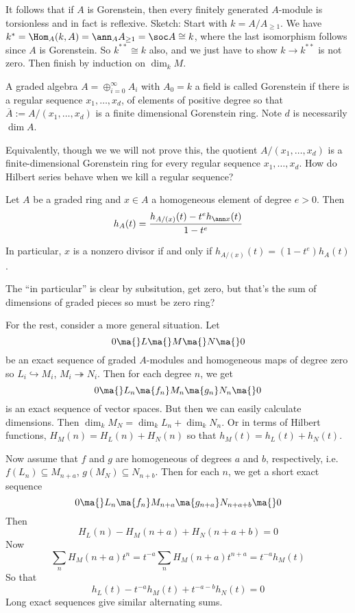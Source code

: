 It follows that if $A$ is Gorenstein, then every finitely generated $A$-module is torsionless and in fact is reflexive. Sketch: Start with $k= A/A_{\geq 1}$. We have $k^*= \Hom_A(k,A)= \ann_A A_{\geq 1}= \soc A \cong k$, where the last isomorphism follows since $A$ is Gorenstein. So $k^{**} \cong k$ also, and we just have to show $k \to k^{**}$ is not zero. Then finish by induction on $\dim_k M$. 






\begin{dfn}
A graded algebra $A= \oplus_{i=0}^\infty A_i$ with $A_0=k$ a field is called Gorenstein if there is a regular sequence $x_1,\ldots,x_d$, of elements of positive degree so that $\overline{A}:= A/(x_1,\ldots,x_d)$ is a finite dimensional Gorenstein ring. Note $d$ is necessarily $\dim A$. 
\end{dfn}


Equivalently, though we we will not prove this, the quotient $A/(x_1,\ldots,x_d)$ is a finite-dimensional Gorenstein ring for every regular sequence $x_1,\ldots,x_d$. How do Hilbert series behave when we kill a regular sequence? 


\begin{prop}
Let $A$ be a graded ring and $x \in A$ a homogeneous element of degree $e>0$. Then
	\[
	h_A(t)= \dfrac{h_{A/(x)}(t) - t^e h_{\ann x}(t)}{1 - t^e}
	\]
\end{prop}

In particular, $x$ is a nonzero divisor if and only if $h_{A/(x)}(t)= (1-t^e) h_A(t)$.


The ``in particular'' is clear by subsitution, get zero, but that's the sum of dimensions of graded pieces so must be zero ring?


For the rest, consider a more general situation. Let
	\[
	0 \ma{} L \ma{} M \ma{} N \ma{} 0
	\]
be an exact sequence of graded $A$-modules and homogeneous maps of degree zero so $L_i \hookrightarrow M_i$, $M_i \twoheadrightarrow N_i$. Then for each degree $n$, we get
	\[
	0 \ma{} L_n \ma{f_n} M_n \ma{g_n} N_n \ma{} 0
	\]
is an exact sequence of vector spaces. But then we can easily calculate dimensions. Then $\dim_k M_N= \dim_k L_n + \dim_k N_n$. Or in terms of Hilbert functions, $H_M(n)= H_L(n) + H_N(n)$ so that $h_M(t)= h_L(t) + h_N(t)$. 


Now assume that $f$ and $g$ are homogeneous of degrees $a$ and $b$, respectively, i.e. $f(L_n) \subseteq M_{n+a}$, $g(M_N) \subseteq N_{n+b}$. Then for each $n$, we get a short exact sequence 
	\[
	0 \ma{} L_n \ma{f_n} M_{n+a} \ma{g_{n+a}} N_{n+a+b} \ma{} 0
	\]
Then 
	\[
	H_L(n) - H_M(n+a) + H_N(n+a+b) = 0 
	\]
Now
	\[
	\sum_n H_M(n+a)t^n = t^{-a} \sum_n H_M(n+a) t^{n+a} = t^{-a} h_M(t)
	\]
So that
	\[
	h_L(t) - t^{-a} h_M(t) + t^{-a-b} h_N(t) = 0 
	\]
Long exact sequences give similar alternating sums. 


